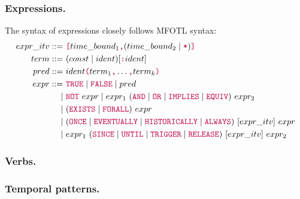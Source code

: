 \documentclass[runningheads]{llncs}
\newcommand{\kw}[1]{{\color{purple}\texttt{#1}}}
\begin{document}
\subsubsection{Expressions.}

\label{sec:expr}

The syntax of expressions closely follows MFOTL syntax:
\begin{align*}
  expr\_itv ::= &~ \kw{[}time\_bound_1\kw{,}(time\_bound_2\mid \kw{*})\kw{]}\\
  term ::= &~(const \mid ident) [\kw{:} ident]\\
  pred ::= &~ident\kw{(}term_1\kw{,}\dots\kw{,}term_k\kw{)}\\
  expr ::= &~ \kw{TRUE} \mid \kw{FALSE} \mid pred\\%
  \mid &~ \kw{NOT}~expr \mid expr_1~(\kw{AND} \mid \kw{OR} \mid \kw{IMPLIES} \mid \kw{EQUIV})~expr_2 \\
  \mid &~ (\kw{EXISTS} \mid \kw{FORALL})~expr \\
  \mid &~(\kw{ONCE} \mid \kw{EVENTUALLY} \mid \kw{HISTORICALLY} \mid \kw{ALWAYS})~[expr\_itv]~expr\\
  \mid &~expr_1~(\kw{SINCE} \mid \kw{UNTIL} \mid \kw{TRIGGER} \mid \kw{RELEASE})~[expr\_itv]~expr_2%
\end{align*}

\subsubsection{Verbs.}

\label{sec:expr-verb}

\subsubsection{Temporal patterns.}

\label{sec:opt}
\end{document}
